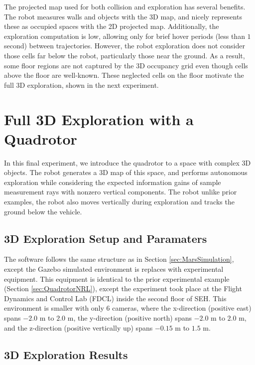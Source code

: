 The projected map used for both collision and exploration has several benefits. The robot measures walls and objects with the 3D map, and nicely represents these as occupied spaces with the 2D projected map. Additionally, the exploration computation is low, allowing only for brief hover periods (less than $1$ second) between trajectories. However, the robot exploration does not consider those cells far below the robot, particularly those near the ground. As a result, some floor regions are not captured by the 3D occupancy grid even though cells above the floor are well-known. These neglected cells on the floor motivate the full 3D exploration, shown in the next experiment.



\section{Full 3D Exploration with a Quadrotor}
\label{sec:QuadrotorSEH}

In this final experiment, we introduce the quadrotor to a space with complex 3D objects. The robot generates a 3D map of this space, and performs autonomous exploration while considering the expected information gains of sample measurement rays with nonzero vertical components. The robot unlike prior examples, the robot also moves vertically during exploration and tracks the ground below the vehicle.

\subsection{3D Exploration Setup and Paramaters}
The software follows the same structure as in Section \ref{sec:MarsSimulation}, except the Gazebo simulated environment is replaces with experimental equipment. This equipment is identical to the prior experimental example (Section \ref{sec:QuadrotorNRL}), except the experiment took place at the Flight Dynamics and Control Lab (FDCL) inside the second floor of SEH. This environment is smaller with only $6$ cameras, where the x-direction (positive east) spans $-2.0$ m to $2.0$ m, the y-direction (positive north) spans $-2.0$ m to $2.0$ m, and the z-direction (positive vertically up) spans $-0.15$ m to $1.5$ m.


\subsection{3D Exploration Results}




